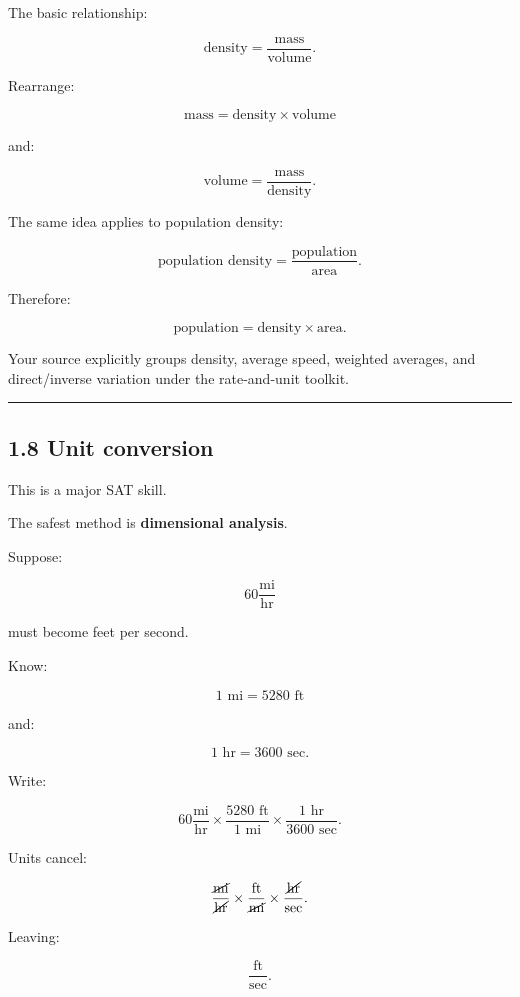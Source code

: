 \documentclass[
]{article}
\begin{document}
The basic relationship:

\[
\boxed{\text{density}=\frac{\text{mass}}{\text{volume}}}.
\]

Rearrange:

\[
\boxed{\text{mass}=\text{density}\times\text{volume}}
\]

and:

\[
\boxed{\text{volume}=\frac{\text{mass}}{\text{density}}}.
\]

The same idea applies to population density:

\[
\boxed{\text{population density}
=
\frac{\text{population}}{\text{area}}}.
\]

Therefore:

\[
\boxed{\text{population}
=
\text{density}\times\text{area}}.
\]

Your source explicitly groups density, average speed, weighted averages,
and direct/inverse variation under the rate-and-unit toolkit.

\begin{center}\rule{0.5\linewidth}{0.5pt}\end{center}

\subsection{1.8 Unit conversion}\label{unit-conversion}

This is a major SAT skill.

The safest method is \textbf{dimensional analysis}.

Suppose:

\[
60\frac{\text{mi}}{\text{hr}}
\]

must become feet per second.

Know:

\[
1\text{ mi}=5280\text{ ft}
\]

and:

\[
1\text{ hr}=3600\text{ sec}.
\]

Write:

\[
60\frac{\text{mi}}{\text{hr}}
\times
\frac{5280\text{ ft}}{1\text{ mi}}
\times
\frac{1\text{ hr}}{3600\text{ sec}}.
\]

Units cancel:

\[
\frac{\cancel{\text{mi}}}{\cancel{\text{hr}}}
\times
\frac{\text{ft}}{\cancel{\text{mi}}}
\times
\frac{\cancel{\text{hr}}}{\text{sec}}.
\]

Leaving:

\[
\frac{\text{ft}}{\text{sec}}.
\]
\end{document}

